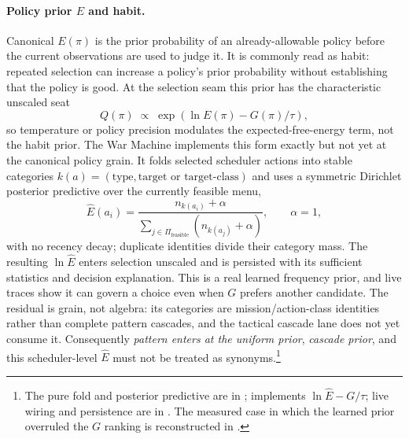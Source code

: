 \paragraph{Policy prior $E$ and habit.} Canonical $E(\pi)$ is the prior probability of an already-allowable policy before the current observations are used to judge it.  It is commonly read as habit: repeated selection can increase a policy's prior probability without establishing that the policy is good.  At the selection seam this prior has the characteristic unscaled seat
\[
  Q(\pi) \;\propto\; \exp\!\left(\ln E(\pi)-G(\pi)/\tau\right),
\]
so temperature or policy precision modulates the expected-free-energy term, not the habit prior.  The War Machine implements this form exactly but not yet at the canonical policy grain.  It folds selected scheduler actions into stable categories $k(a)=(\text{type},\text{target or target-class})$ and uses a symmetric Dirichlet posterior predictive over the currently feasible menu,
\[
  \widehat E(a_i) = \frac{n_{k(a_i)}+\alpha}{\sum_{j\in\Pi_{\mathrm{feasible}}}(n_{k(a_j)}+\alpha)},
  \qquad \alpha=1,
\]
with no recency decay; duplicate identities divide their category mass.  The resulting $\ln\widehat E$ enters selection unscaled and is persisted with its sufficient statistics and decision explanation.  This is a real learned frequency prior, and live traces show it can govern a choice even when $G$ prefers another candidate.  The residual is grain, not algebra: its categories are mission/action-class identities rather than complete pattern cascades, and the tactical cascade lane does not yet consume it.  Consequently \emph{pattern enters at the uniform prior}, \emph{cascade prior}, and this scheduler-level $\widehat E$ must not be treated as synonyms.\footnote{The pure fold and posterior predictive are in ;  implements $\ln\widehat E-G/\tau$; live wiring and persistence are in .  The measured case in which the learned prior overruled the $G$ ranking is reconstructed in .}

